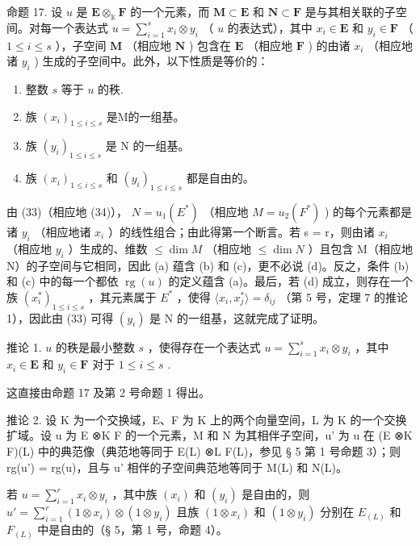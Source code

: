 命题 17. 设 \(u\) 是 \(\mathbf{E} \otimes_{\mathbb{K}} \mathbf{F}\) 的一个元素，而 \(\mathbf{M} \subset \mathbf{E}\) 和 \(\mathbf{N} \subset \mathbf{F}\) 是与其相关联的子空间。对每一个表达式 \(u = \sum_{i=1}^{s} x_i \otimes y_i\) （ \(u\) 的表达式），其中 \(x_i \in \mathbf{E}\) 和 \(y_i \in \mathbf{F}\) （ \(1 \leqslant i \leqslant s\) ），子空间 \(\mathbf{M}\) （相应地 \(\mathbf{N}\) ) 包含在 \(\mathbf{E}\) （相应地 \(\mathbf{F}\) ) 的由诸 \(x_i\) （相应地诸 \(y_i\) ) 生成的子空间中。此外，以下性质是等价的：

\begin{enumerate}
\def\labelenumi{(\alph{enumi})}
\item
  整数 \(s\) 等于 \(u\) 的秩.
\item
  族 \((x_{i})_{1\leqslant i\leqslant s}\) 是M的一组基。
\item
  族 \((y_{i})_{1\leqslant i\leqslant s}\) 是 N 的一组基。
\item
  族 \((x_{i})_{1\leqslant i\leqslant s}\) 和 \((y_{i})_{1\leqslant i\leqslant s}\) 都是自由的。
\end{enumerate}

由 (33)（相应地 (34)）， \(N = u_{1}(E^{*})\) （相应地 \(M = u_{2}(F^{*})\) ) 的每个元素都是诸 \(y_{i}\) （相应地诸 \(x_{i}\) ）的线性组合；由此得第一个断言。若 s = r，则由诸 \(x_{i}\) （相应地 \(y_{i}\) ）生成的、维数 \(\leqslant \dim M\) （相应地 \(\leqslant \dim N\) ）且包含 M（相应地 N）的子空间与它相同，因此 (a) 蕴含 (b) 和 (c)，更不必说 (d)。反之，条件 (b) 和 (c) 中的每一个都依 \(\operatorname{rg}(u)\) 的定义蕴含 (a)。最后，若 (d) 成立，则存在一个族 \((x_{i}^{*})_{1\leqslant i\leqslant s}\) ，其元素属于 \(E^{*}\) ，使得 \(\langle x_{i}, x_{j}^{*}\rangle = \delta_{ij}\) （第 5 号，定理 7 的推论 1），因此由 (33) 可得 \((y_{i})\) 是 N 的一组基，这就完成了证明。

推论 1. \(u\) 的秩是最小整数 \(s\) ，使得存在一个表达式 \(u = \sum_{i=1}^{s} x_i \otimes y_i\) ，其中 \(x_i \in \mathbf{E}\) 和 \(y_i \in \mathbf{F}\) 对于 \(1 \leqslant i \leqslant s\) .

这直接由命题 17 及第 2 号命题 1 得出。

推论 2. 设 K 为一个交换域，E、F 为 K 上的两个向量空间，L 为 K 的一个交换扩域。设 u 为 E ⊗K F 的一个元素，M 和 N 为其相伴子空间，u' 为 u 在 (E ⊗K F)(L) 中的典范像（典范地等同于 E(L) ⊗L F(L)，参见 § 5 第 1 号命题 3）；则 rg(u') = rg(u)，且与 u' 相伴的子空间典范地等同于 M(L) 和 N(L)。

若 \(u = \sum_{i=1}^{r} x_i \otimes y_i\) ，其中族 \((x_i)\) 和 \((y_i)\) 是自由的，则 \(u' = \sum_{i=1}^{r} (1 \otimes x_i) \otimes (1 \otimes y_i)\) 且族 \((1 \otimes x_i)\) 和 \((1 \otimes y_i)\) 分别在 \(E_{(L)}\) 和 \(F_{(L)}\) 中是自由的（§ 5，第 1 号，命题 4）。

